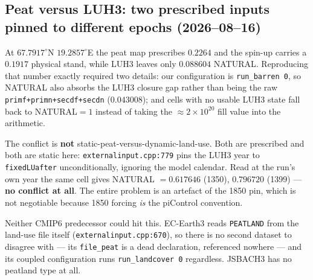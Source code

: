 \documentclass[10pt]{article}
\begin{document}
\subsection{Peat versus LUH3: two prescribed inputs pinned to different epochs
(2026--08--16)}\label{sub:r29peat}
At $67.7917^\circ$N $19.2857^\circ$E the peat map prescribes $0.2264$ and the spin-up
carries a $0.1917$ physical stand, while LUH3 leaves only $\mathbf{0.088604}$ NATURAL.
Reproducing that number exactly required two details: our configuration is
\texttt{run\_barren 0}, so NATURAL also absorbs the LUH3 closure gap rather than being the
raw \texttt{primf+primn+secdf+secdn} ($0.043008$); and cells with no usable LUH3 state fall
back to NATURAL${=}1$ instead of taking the ${\approx}2\times10^{20}$ fill value into the
arithmetic.

The conflict is \textbf{not} static-peat-versus-dynamic-land-use. Both are prescribed and
both are static here: \texttt{externalinput.cpp:779} pins the LUH3 year to
\texttt{fixedLUafter} unconditionally, ignoring the model calendar. Read at the run's own
year the same cell gives NATURAL $=0.617646$ (1350), $0.796720$ (1399) --- \textbf{no
conflict at all}. The entire problem is an artefact of the 1850 pin, which is not
negotiable because 1850 forcing \emph{is} the piControl convention.

Neither CMIP6 predecessor could hit this. EC-Earth3 reads \texttt{PEATLAND} from the
land-use file itself (\texttt{externalinput.cpp:670}), so there is no second dataset to
disagree with --- its \texttt{file\_peat} is a dead declaration, referenced nowhere ---
and its coupled configuration runs \texttt{run\_landcover 0} regardless. JSBACH3 has no
peatland type at all.
\end{document}
